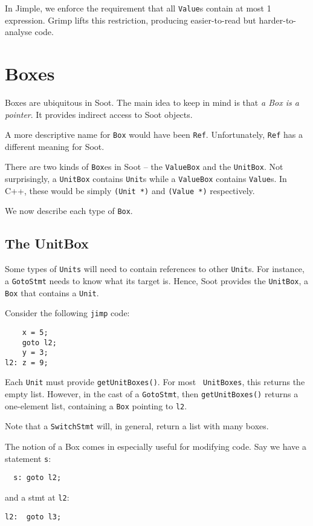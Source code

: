 \documentclass{article}
\begin{document}
In Jimple, we enforce the requirement that all {\tt Value}s contain at most
1 expression.  Grimp lifts this restriction, producing easier-to-read
but harder-to-analyse code.

\section{Boxes}

Boxes are ubiquitous in Soot.  The main idea to keep in mind is that
{\em a Box is a pointer}.  It provides indirect access to Soot objects.

A more descriptive name for {\tt Box} would have been {\tt Ref}.
Unfortunately, {\tt Ref} has a different meaning for Soot.

There are two kinds of {\tt Box}es in Soot -- the {\tt ValueBox} 
and the {\tt UnitBox}.  Not surprisingly, a {\tt UnitBox} contains
{\tt Unit}s while a {\tt ValueBox} contains {\tt Value}s.  In C++, these
would be simply {\tt (Unit *)} and {\tt (Value *)} respectively.  

We now describe each type of {\tt Box}.

\subsection{The UnitBox}

Some types of {\tt Units} will need to contain references to other
{\tt Unit}s.  For instance, a {\tt GotoStmt} needs to know what its
target is.  Hence, Soot provides the {\tt UnitBox}, a {\tt Box} that
contains a {\tt Unit}.

Consider the following {\tt jimp} code:
\begin{verbatim}
    x = 5;
    goto l2;
    y = 3;
l2: z = 9;
\end{verbatim}


Each {\tt Unit} must provide {\tt getUnitBoxes()}.  For most {\tt
UnitBoxes}, this returns the empty list.  However, in the cast of a
{\tt GotoStmt}, then {\tt getUnitBoxes()} returns a one-element list,
containing a {\tt Box} pointing to {\tt l2}.

Note that a {\tt SwitchStmt} will, in general, return a list with many
boxes.

The notion of a Box comes in especially useful for modifying code.
Say we have a statement {\tt s}:
\begin{verbatim}
  s: goto l2;
\end{verbatim}
and a stmt at {\tt l2}:
\begin{verbatim}
l2:  goto l3;
\end{verbatim}
\end{document}
